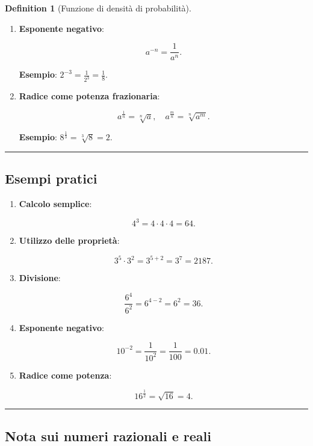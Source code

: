 \documentclass[
  letterpaper,
  DIV=11,
  numbers=noendperiod,
  oneside]{scrreprt}
\theoremstyle{definition}
\theoremstyle{plain}
\theoremstyle{definition}
\newtheorem{definition}{Definition}[chapter]
\theoremstyle{remark}
\begin{document}
\begin{definition}[Funzione di densità di
probabilità]
\begin{enumerate}
  \[
  a^0 = 1, \quad \text{con } a \neq 0.
  \]

  \textbf{Esempio}: \(5^0 = 1\).
\item
  \textbf{Esponente negativo}:

  \[
  a^{-n} = \frac{1}{a^n}.
  \]

  \textbf{Esempio}: \(2^{-3} = \frac{1}{2^3} = \frac{1}{8}\).
\item
  \textbf{Radice come potenza frazionaria}:

  \[
  a^{\frac{1}{n}} = \sqrt[n]{a}, \quad a^{\frac{m}{n}} = \sqrt[n]{a^m}.
  \]

  \textbf{Esempio}: \(8^{\frac{1}{3}} = \sqrt[3]{8} = 2\).
\end{enumerate}

\begin{center}\rule{0.5\linewidth}{0.5pt}\end{center}

\subsection{Esempi pratici}\label{esempi-pratici}

\begin{enumerate}
\def\labelenumi{\arabic{enumi}.}
\item
  \textbf{Calcolo semplice}:

  \[
  4^3 = 4 \cdot 4 \cdot 4 = 64.
  \]
\item
  \textbf{Utilizzo delle proprietà}:

  \[
  3^5 \cdot 3^2 = 3^{5+2} = 3^7 = 2187.
  \]
\item
  \textbf{Divisione}:

  \[
  \frac{6^4}{6^2} = 6^{4-2} = 6^2 = 36.
  \]
\item
  \textbf{Esponente negativo}:

  \[
  10^{-2} = \frac{1}{10^2} = \frac{1}{100} = 0.01.
  \]
\item
  \textbf{Radice come potenza}:

  \[
  16^{\frac{1}{2}} = \sqrt{16} = 4.
  \]
\end{enumerate}

\begin{center}\rule{0.5\linewidth}{0.5pt}\end{center}

\subsection{Nota sui numeri razionali e
reali}\label{nota-sui-numeri-razionali-e-reali}


\end{definition}
\end{document}
